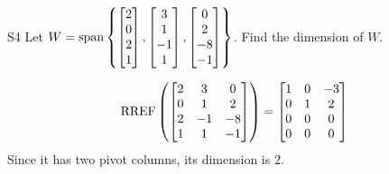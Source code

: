 \begin{problem}{S4}
Let \(
  W=\operatorname{span}\left\{
    \begin{bmatrix} 2 \\ 0 \\ 2 \\ 1 \end{bmatrix},
    \begin{bmatrix} 3 \\ 1 \\ -1 \\ 1 \end{bmatrix},
    \begin{bmatrix} 0 \\ 2 \\ -8 \\ -1 \end{bmatrix}
  \right\}
\). Find the dimension of \(W\).
\end{problem}
\begin{solution}
\[
  \operatorname{RREF}\left(\begin{bmatrix}
    2 & 3 & 0 \\
    0 & 1 & 2 \\
    2 & -1 & -8 \\
    1 & 1 & -1
  \end{bmatrix} \right) =
  \begin{bmatrix}
    1 & 0 & -3 \\
    0 & 1 & 2 \\
    0 & 0 & 0 \\
    0 & 0 & 0
  \end{bmatrix}
\]
Since it has two pivot columns, its dimension is \(2\).
\end{solution}





